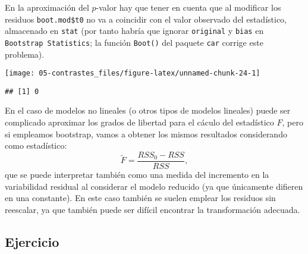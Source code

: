 \documentclass[]{book}
\newenvironment{Shaded}{\begin{snugshade}}{\end{snugshade}}
\newcommand{\KeywordTok}[1]{\textcolor[rgb]{0.13,0.29,0.53}{\textbf{#1}}}
\newcommand{\DataTypeTok}[1]{\textcolor[rgb]{0.13,0.29,0.53}{#1}}
\newcommand{\DecValTok}[1]{\textcolor[rgb]{0.00,0.00,0.81}{#1}}
\newcommand{\StringTok}[1]{\textcolor[rgb]{0.31,0.60,0.02}{#1}}
\newcommand{\OtherTok}[1]{\textcolor[rgb]{0.56,0.35,0.01}{#1}}
\newcommand{\OperatorTok}[1]{\textcolor[rgb]{0.81,0.36,0.00}{\textbf{#1}}}
\newcommand{\NormalTok}[1]{#1}
\theoremstyle{break}
\theoremstyle{definition}
\theoremstyle{definition}
\theoremstyle{definition}
\theoremstyle{remark}
\begin{document}
En la aproximación del \(p\)-valor hay que tener en cuenta que al
modificar los residuos \texttt{boot.mod\$t0} no va a coincidir con el
valor observado del estadístico, almacenado en \texttt{stat} (por tanto
habría que ignorar \texttt{original} y \texttt{bias} en
\texttt{Bootstrap\ Statistics}; la función \texttt{Boot()} del paquete
\texttt{car} corrige este problema).

\begin{Shaded}
\end{Shaded}

\begin{center}\texttt{[image: 05-contrastes\_files/figure-latex/unnamed-chunk-24-1]} \end{center}

\begin{Shaded}
\end{Shaded}

\begin{verbatim}
## [1] 0
\end{verbatim}

En el caso de modelos no lineales (o otros tipos de modelos lineales)
puede ser complicado aproximar los grados de libertad para el cáculo del
estadístico \(F\), pero si empleamos bootstrap, vamos a obtener los
mismos resultados considerando como estadístico:
\[\tilde F =\frac{RSS_0 - RSS}{RSS},\] que se puede interpretar también
como una medida del incremento en la variabilidad residual al considerar
el modelo reducido (ya que únicamente difieren en una constante). En
este caso también se suelen emplear los residuos sin reescalar, ya que
también puede ser difícil encontrar la transformación adecuada.

\subsection{Ejercicio}\label{ejercicio}
\end{document}

